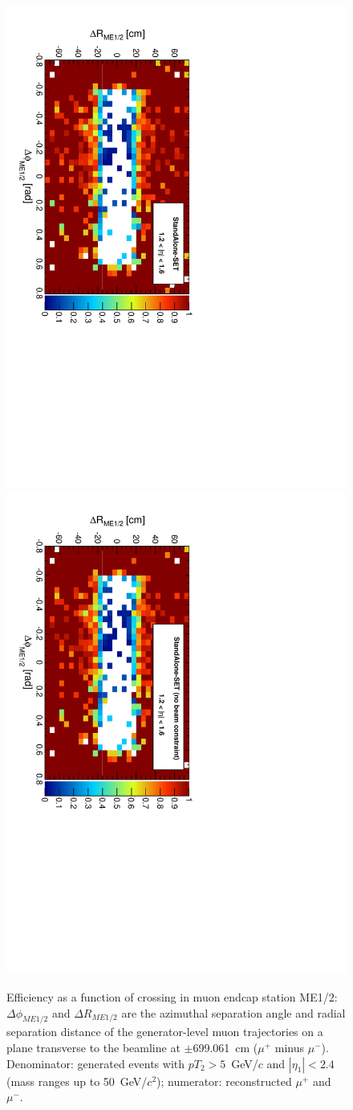 \documentclass[12pt]{article}
\begin{document}
\begin{figure}[p]
\includegraphics[height=0.5\linewidth, angle=90]{fig/acceptance7_plot/me12_StandAloneUpdatedSET.pdf}
\includegraphics[height=0.5\linewidth, angle=90]{fig/acceptance7_plot/me12_StandAloneSET.pdf}

\caption{Efficiency as a function of crossing in muon endcap station
  ME1/2: $\Delta\phi_{ME1/2}$ and $\Delta R_{ME1/2}$ are the azimuthal
  separation angle and radial separation distance of the
  generator-level muon trajectories on a plane transverse to the
  beamline at $\pm$699.061~cm ($\mu^+$ minus $\mu^-$).  Denominator:
  generated events with $pT_2 > 5$~GeV/$c$ and $|\eta_1| < 2.4$ (mass
  ranges up to 50~GeV/$c^2$); numerator: reconstructed $\mu^+$ and
  $\mu^-$. \label{fig:me12}}
\end{figure}
\end{document}
